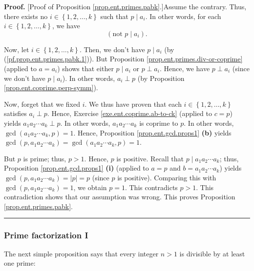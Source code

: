 \documentclass[numbers=enddot,12pt,final,onecolumn,notitlepage]{scrartcl}%
\numberwithin{exer}{subsection}
\theoremstyle{definition}
\newenvironment{fineprint}{\begin{small}}{\end{small}}
\newenvironment{proof}[1][Proof]{\noindent\textbf{#1.} }{\ \rule{0.5em}{0.5em}}
\begin{document}
\begin{fineprint}
\begin{proof}
[Proof of Proposition \ref{prop.ent.primes.pabk}.]Assume the contrary. Thus,
there exists no $i\in\left\{  1,2,\ldots,k\right\}  $ such that $p\mid a_{i}$.
In other words, for each $i\in\left\{  1,2,\ldots,k\right\}  $, we have%
\begin{equation}
\left(  \text{not }p\mid a_{i}\right)  . \label{pf.prop.ent.primes.pabk.1}%
\end{equation}


Now, let $i\in\left\{  1,2,\ldots,k\right\}  $. Then, we don't have $p\mid
a_{i}$ (by (\ref{pf.prop.ent.primes.pabk.1})). But Proposition
\ref{prop.ent.primes.div-or-coprime} (applied to $a=a_{i}$) shows that either
$p\mid a_{i}$ or $p\perp a_{i}$. Hence, we have $p\perp a_{i}$ (since we don't
have $p\mid a_{i}$). In other words, $a_{i}\perp p$ (by Proposition
\ref{prop.ent.coprime.perp-symm}).

Now, forget that we fixed $i$. We thus have proven that each $i\in\left\{
1,2,\ldots,k\right\}  $ satisfies $a_{i}\perp p$. Hence, Exercise
\ref{exe.ent.coprime.ab-to-ck} (applied to $c=p$) yields $a_{1}a_{2}\cdots
a_{k}\perp p$. In other words, $a_{1}a_{2}\cdots a_{k}$ is coprime to $p$. In
other words, $\gcd\left(  a_{1}a_{2}\cdots a_{k},p\right)  =1$. Hence,
Proposition \ref{prop.ent.gcd.props1} \textbf{(b)} yields $\gcd\left(
p,a_{1}a_{2}\cdots a_{k}\right)  =\gcd\left(  a_{1}a_{2}\cdots a_{k},p\right)
=1$.

But $p$ is prime; thus, $p>1$. Hence, $p$ is positive. Recall that $p\mid
a_{1}a_{2}\cdots a_{k}$; thus, Proposition \ref{prop.ent.gcd.props1}
\textbf{(i)} (applied to $a=p$ and $b=a_{1}a_{2}\cdots a_{k}$) yields
$\gcd\left(  p,a_{1}a_{2}\cdots a_{k}\right)  =\left\vert p\right\vert =p$
(since $p$ is positive). Comparing this with $\gcd\left(  p,a_{1}a_{2}\cdots
a_{k}\right)  =1$, we obtain $p=1$. This contradicts $p>1$. This contradiction
shows that our assumption was wrong. This proves Proposition
\ref{prop.ent.primes.pabk}.
\end{proof}
\end{fineprint}

\subsubsection{Prime factorization I}

The next simple proposition says that every integer $n>1$ is divisible by at
least one prime:
\end{document}
